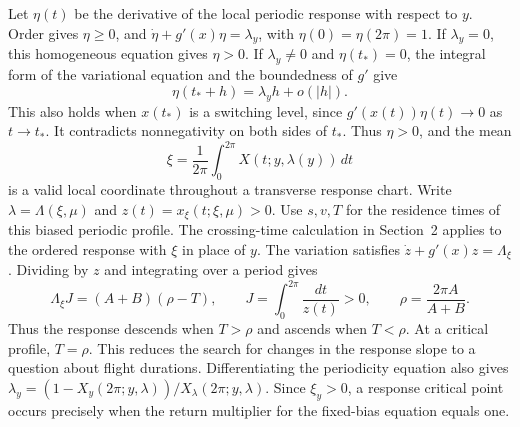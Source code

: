 \documentclass[11pt,a4paper]{article}
\begin{document}
Let $\eta(t)$ be the derivative of the local periodic response with
respect to $y$. Order gives $\eta\geq0$, and
$\dot\eta+g'(x)\eta=\lambda_y$, with $\eta(0)=\eta(2\pi)=1$.
If $\lambda_y=0$, this homogeneous equation gives $\eta>0$.
If $\lambda_y\ne0$ and $\eta(t_*)=0$, the integral form of the variational
equation and the boundedness of $g'$ give
\[
 \eta(t_*+h)=\lambda_y h+o(|h|).
\]
This also holds when $x(t_*)$ is a switching level, since
$g'(x(t))\eta(t)\to0$ as $t\to t_*$. It contradicts nonnegativity
on both sides of $t_*$. Thus $\eta>0$, and the mean
\[
 \xi=\frac1{2\pi}\int_0^{2\pi}X(t;y,\lambda(y))\,dt
\]
is a valid local coordinate throughout a transverse response chart.
Write $\lambda=\Lambda(\xi,\mu)$ and $z(t)=x_\xi(t;\xi,\mu)>0$.
Use $s,v,T$ for the residence times of this biased periodic profile.
The crossing-time calculation in Section~2 applies to the ordered
response with $\xi$ in place of $y$.
The variation satisfies $\dot z+g'(x)z=\Lambda_\xi$. Dividing by $z$ and integrating
over a period gives
\begin{equation}\label{eq:response-identity}
 \boxed{\Lambda_\xi J=(A+B)(\rho-T),\qquad
 J=\int_0^{2\pi}\frac{dt}{z(t)}>0,\qquad
 \rho=\frac{2\pi A}{A+B}.}
\end{equation}
Thus the response descends when $T>\rho$ and ascends when $T<\rho$.
At a critical profile, $T=\rho$. This reduces the search for changes in
the response slope to a question about flight durations.
Differentiating the periodicity equation also gives
$\lambda_y=(1-X_y(2\pi;y,\lambda))/X_\lambda(2\pi;y,\lambda)$.
Since $\xi_y>0$, a response critical point occurs precisely when the
return multiplier for the fixed-bias equation equals one.
\end{document}
